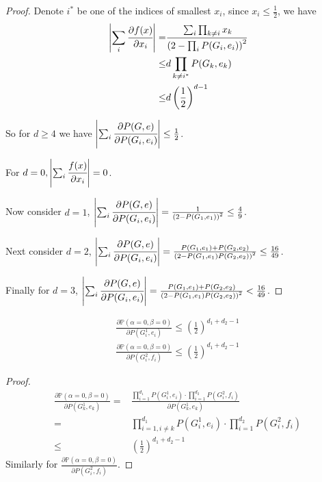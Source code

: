 	\begin{proof}
		Denote $i^*$ be one of the indices of smallest $x_i$, since $x_i \leq \frac{1}{2}$, we have
	\begin{align*}
		\left\vert\sum_i \cfrac{\partial f(x)}{\partial x_i}\right\vert  =& \cfrac{\sum_i \prod_{k \neq i} x_k  }{\left( 2 - \prod_i P(G_i, e_i) \right)^2} \\
		\leq & d \prod_{k \neq i^*} P(G_k, e_k) \\
		\leq & d \left( \frac{1}{2} \right)^{d-1}
	\end{align*}

	So for $d \geq 4$ we have $\left\vert\sum_i \cfrac{\partial P(G,e)}{\partial P(G_i,e_i)}\right\vert \leq \frac{1}{2}$.

	For $d=0, \left\vert\sum_i \cfrac{f(x)}{\partial x_i}\right\vert = 0$.

	Now consider $d=1$, $\left\vert\sum_i \cfrac{\partial P(G,e)}{\partial P(G_i,e_i)}\right\vert = \frac{1}{\left( 2 - P(G_1,e_1) \right)^2} \leq \frac{4}{9} $.

	Next consider $d=2$,  $\left\vert\sum_i \cfrac{\partial P(G,e)}{\partial P(G_i,e_i)}\right\vert = \frac{P(G_1,e_1) + P(G_2,e_2)}{\left( 2 - P(G_1,e_1)P(G_2,e_2) \right)^2} \leq \frac{16}{49} $.

	Finally for $d=3$,  $\left\vert\sum_i \cfrac{\partial P(G,e)}{\partial P(G_i,e_i)}\right\vert = \frac{P(G_1,e_1) + P(G_2,e_2)}{\left( 2 - P(G_1,e_1)P(G_2,e_2) \right)^2} < \frac{16}{49} $.
	\end{proof}



	\begin{Prop}
		\begin{align*}
			\frac{\partial \mathbb{P}\left( \alpha = 0, \beta = 0 \right) }{ \partial P(G_i^1, e_i) } \leq (\frac{1}{2})^{d_1 + d_2 -1} \\
			\frac{\partial \mathbb{P}\left( \alpha = 0, \beta = 0 \right) }{ \partial P(G_i^2, f_i) } \leq (\frac{1}{2})^{d_1 + d_2 -1} 
		\end{align*}
	\end{Prop}
	\begin{proof}
		\begin{align*}
			\frac{\partial \mathbb{P}\left( \alpha = 0, \beta = 0 \right) }{ \partial P(G_k^1, e_k) } = &\frac{\prod_{i=1}^{d_1} P(G_i^1, e_i) \cdot \prod_{i=1}^{d_2} P(G_i^2, f_i) }{\partial P(G_k^1, e_k)} \\
			=&\prod_{i=1,i\neq k}^{d_1} P(G_i^1, e_i) \cdot \prod_{i=1}^{d_2} P(G_i^2, f_i)\\
			\leq & (\frac{1}{2})^{d_1 + d_2 -1}
		\end{align*}
		Similarly for $\frac{\partial \mathbb{P}\left( \alpha = 0, \beta = 0 \right) }{ \partial P(G_i^2, f_i) }$.
	\end{proof}

